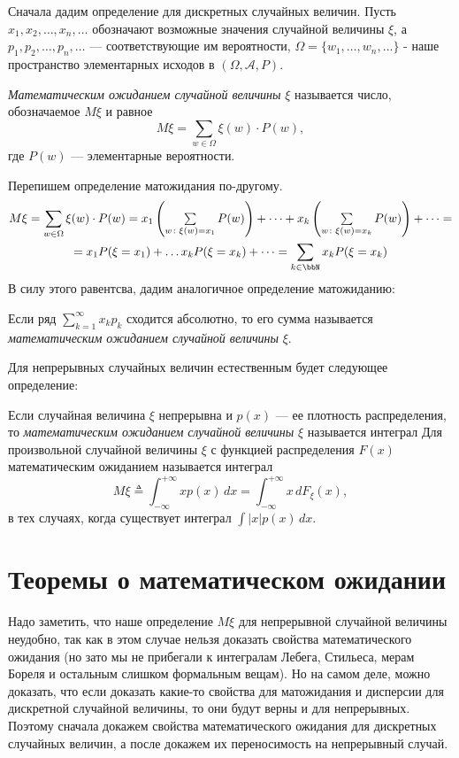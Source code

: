 Сначала дадим определение для дискретных случайных величин. Пусть $x_1,x_2,\dots,x_n,\dots$ обозначают возможные значения случайной величины $\xi$, а $p_1,p_2,\dots,p_n,\dots$ --- соответствующие им вероятности, $\Omega = \{w_1,\dots, w_n,...\}$ - наше пространство элементарных исходов в $(\Omega,\mathcal A, P)$.
\begin{defn}\label{teorver1}
\textit{Математическим ожиданием случайной величины} $\xi$ называется число, обозначаемое $M\xi$ и равное
\begin{equation}
M\xi = \sum_{w \in \Omega} \xi(w)\cdot P(w),
\end{equation}
где $P(w)$ --- элементарные вероятности.
\end{defn}
Перепишем определение матожидания по-другому.
\begin{multline*}
M\xi=\sum_{w \in \Omega} \xi(w)\cdot P(w)=x_1\left(\textstyle\sum\limits_{w\colon \xi(w)=x_1} P(w)\right)+\dots+x_k\left(\textstyle\sum\limits_{w\colon \xi(w)=x_k} P(w)\right)+\dots=\\=x_1P(\xi=x_1)+\dots x_kP(\xi=x_k)+\dots=\sum_{k\in \bbN} x_kP(\xi=x_k)
\end{multline*}
В силу этого равентсва, дадим аналогичное определение матожиданию:
\begin{defnn}\label{teorver1s}
Если ряд $\sum\limits_{k=1}^{\infty}x_k p_k$ сходится абсолютно, то его сумма называется \textit{математическим ожиданием случайной величины} $\xi$.
\end{defnn}


Для непрерывных случайных величин естественным будет следующее определение: 
\begin{defn} 
Если случайная величина $\xi$ непрерывна и $p(x)$ --- ее плотность распределения, то \textit{математическим ожиданием} \textit{случайной величины} $\xi$ называется интеграл Для произвольной случайной величины $\xi$ с функцией распределения $F(x)$ математическим ожиданием называется интеграл
\begin{equation}
M\xi\triangleq\int_{-\infty}^{+\infty} xp(x)\,dx = \int_{-\infty}^{+\infty} x\,dF_\xi(x),
\end{equation}
в тех случаях, когда существует интеграл $\int |x|p(x)\,dx.$ 
\end{defn}



\section{Теоремы о математическом ожидании}
Надо заметить, что наше определение $M\xi$ для непрерывной случайной величины неудобно, так как в этом случае нельзя доказать свойства математического ожидания (но зато мы не прибегали к интегралам Лебега, Стильеса, мерам Бореля и остальным слишком формальным вещам). Но на самом деле, можно доказать, что если доказать какие-то свойства для матожидания и дисперсии для дискретной случайной величины, то они будут верны и для непрерывных. Поэтому сначала докажем свойства математического ожидания для дискретных случайных величин, а после докажем их переносимость на непрерывный случай.

